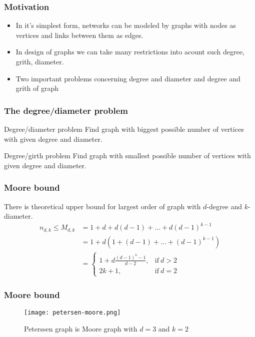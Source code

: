 \documentclass{beamer}
\begin{document}
\begin{frame}
	\frametitle{Motivation}
\begin{itemize}
    \item In it's simplest form, networks can be modeled by graphs with nodes as vertices and links between them as edges.
	\item In design of graphs we can take many restrictions into acount such degree, grith, diameter.
	\item Two important problems concerning degree and diameter and degree and grith of graph
\end{itemize}
\end{frame}
\begin{frame}
\frametitle{The degree/diameter problem}
\begin{block}{Degree/diameter problem}
Find graph with biggest possible number of vertices with given degree and diameter.
\end{block}
\begin{block}{Degree/girth problem}
Find graph with smallest possible number of vertices with given degree and diameter.
\end{block}
\end{frame}
\begin{frame}
	\frametitle{Moore bound}
There is theoretical upper bound for largest order of graph with $d$-degree and $k$-diameter.
\begin{equation}\label{eq:Moore}
	\begin{split}
		n_{d,k} \leq M_{d,k}    & = 1 + d + d(d - 1) + \dots + d(d - 1)^{k-1}  \\
								& = 1 + d(1 + (d - 1) + \dots + (d - 1)^{k-1}) \\
                                & = \begin{cases}
                                        1+d\frac{(d-1)^{k}-1}{d-2}, & \text{if}\ d > 2 \\
                                    	2k+1, & \text{if}\ d=2
    								\end{cases}
    \end{split}
\end{equation}
\end{frame}
\begin{frame}
	\frametitle{Moore bound}
		\begin{figure}[!ht]
    		\centering
    		\texttt{[image: petersen-moore.png]}
    		\caption{Peterssen graph is Moore graph with $d=3$ and $k=2$ }
		\end{figure}

\end{frame}
\end{document}
